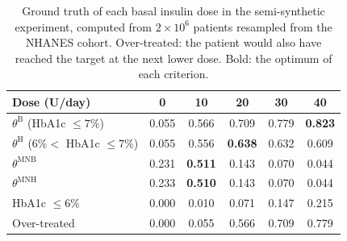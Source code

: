 \begin{table}[tb]
\centering
\caption{Ground truth of each basal insulin dose in the semi-synthetic experiment, computed from $2\times10^6$ patients resampled from the NHANES cohort. Over-treated: the patient would also have reached the target at the next lower dose. Bold: the optimum of each criterion.}
\label{tab:nhanes_truth}
\small
\begin{tabular}{lccccc}
\hline
Dose (U/day) & 0 & 10 & 20 & 30 & 40 \\
\hline
$\theta^{\text{B}}$ (HbA1c $\le7\%$) & 0.055 & 0.566 & 0.709 & 0.779 & \textbf{0.823} \\
$\theta^{\text{H}}$ ($6\%<$ HbA1c $\le7\%$) & 0.055 & 0.556 & \textbf{0.638} & 0.632 & 0.609 \\
$\theta^{\text{MNB}}$ & 0.231 & \textbf{0.511} & 0.143 & 0.070 & 0.044 \\
$\theta^{\text{MNH}}$ & 0.233 & \textbf{0.510} & 0.143 & 0.070 & 0.044 \\
HbA1c $\le6\%$ & 0.000 & 0.010 & 0.071 & 0.147 & 0.215 \\
Over-treated & 0.000 & 0.055 & 0.566 & 0.709 & 0.779 \\
\hline
\end{tabular}
\end{table}
